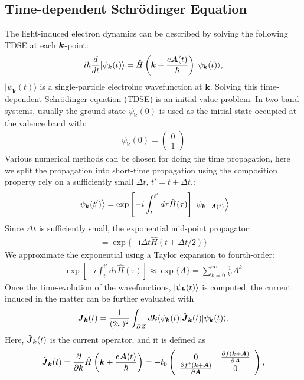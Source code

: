 \subsection{Time-dependent Schr\"odinger Equation}
The light-induced electron dynamics can be described by solving the following \gls {TDSE} at each $\boldsymbol k$-point:
\begin{equation}
i\hbar \frac{d}{dt}| \psi_{\boldsymbol {k}}(t) \rangle = \hat{H}\left ( \boldsymbol k + \frac{e\boldsymbol A(t)}{\hbar} \right )| \psi_{\boldsymbol k}(t) \rangle,
\label{eqn:TDSE}
\end{equation}
$|\psi_{\boldsymbol k}(t)\rangle$ is a single-particle electroinc wavefunction at $\boldsymbol k$.
Solving this time-dependent Schr\"odinger equation (\gls {TDSE}) is an initial value problem. In two-band systems, usually the ground state $\psi_{\boldsymbol k}(0)$ is used as the initial state occupied at the valence band with:
\begin{align}
\psi_{\boldsymbol k}(0) = \left(\begin{array}{cc}
0 \\
1
\end{array}\right)
\end{align}
Various numerical methods can be chosen for doing the time propagation, here we split the propagation into short-time propagation using the composition property rely on a sufficiently small $\Delta t$, $t'=t+\Delta t$,:
\begin{equation}
\left|\psi_{\boldsymbol{k}}(t')\right\rangle=\exp \left[-i \int_{t}^{t'} d \tau \hat{H}(\tau) \right]\left|\psi_{\boldsymbol{k}+\boldsymbol{A}(t)}\right\rangle
\label{eqn:Houston}
\end{equation}
Since $\Delta t$ is sufficiently small, the exponential mid-point propagator:
\begin{align}
    =\exp \{-\mathrm{i} \Delta t \hat{H}(t+\Delta t / 2)\}
\end{align}
We approximate the exponential using a Taylor expansion to fourth-order:
\begin{align}
 \exp \left[-i \int_{t}^{t'} d \tau \hat{H}(\tau) \right] \approx \exp \{A\}=\sum_{k=0}^{\infty} \frac{1}{k!} A^k
\end{align}
Once the time-evolution of the wavefunctions, $|\psi_{\boldsymbol k}(t)\rangle$ is computed, the current induced in the matter can be further evaluated with
\begin{align}
\boldsymbol{J}_{\boldsymbol k}(t)=\frac{1}{(2\pi)^2} \int_{BZ} d\boldsymbol k\langle \psi_{\boldsymbol k}(t)|\hat{\boldsymbol J}_{\boldsymbol k}(t)| \psi_{\boldsymbol{k}}(t)\rangle.
\label{eq:current}
\end{align}
Here, $\hat {\boldsymbol J}_{\boldsymbol k}(t)$ is the current operator, and it is defined as
\begin{align}
\hat {\boldsymbol J}_{\boldsymbol k}(t) = \frac{\partial }{\partial \boldsymbol k}\hat H \left (\boldsymbol k + \frac{e\boldsymbol A(t)}{\hbar} \right ) = 
-t_0 \left(\begin{array}{cc}
0 & \frac{\partial f(\boldsymbol{k}+\boldsymbol{A})}{\partial \boldsymbol A} \\
\frac{\partial f^*(\boldsymbol{k}+\boldsymbol{A})}{\partial \boldsymbol A}  & 0
\end{array}\right),
\end{align}

